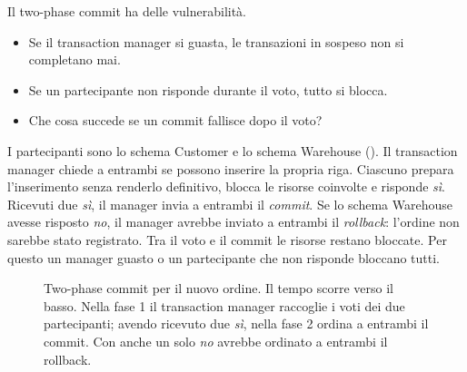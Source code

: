 Il two-phase commit ha delle vulnerabilità.
\begin{itemize}
  \item Se il transaction manager si guasta, le transazioni in sospeso non si completano mai.
  \item Se un partecipante non risponde durante il voto, tutto si blocca.
  \item Che cosa succede se un commit fallisce dopo il voto?
\end{itemize}

\begin{esempio}
I partecipanti sono lo schema Customer e lo schema Warehouse (). Il transaction manager chiede
a entrambi se possono inserire la propria riga. Ciascuno prepara l'inserimento senza renderlo definitivo, blocca le
risorse coinvolte e risponde \emph{sì}. Ricevuti due \emph{sì}, il manager invia a entrambi il \emph{commit}. Se lo
schema Warehouse avesse risposto \emph{no}, il manager avrebbe inviato a entrambi il \emph{rollback}: l'ordine non
sarebbe stato registrato. Tra il voto e il commit le risorse restano bloccate. Per questo un manager guasto o un
partecipante che non risponde bloccano tutti.
\end{esempio}

\begin{figure}[ht]
\centering
{}
\caption{Two-phase commit per il nuovo ordine. Il tempo scorre verso il basso. Nella fase 1 il transaction manager raccoglie
i voti dei due partecipanti; avendo ricevuto due \emph{sì}, nella fase 2 ordina a entrambi il commit. Con anche un solo
\emph{no} avrebbe ordinato a entrambi il rollback.}
\label{fig:split-2pc}
\end{figure}

